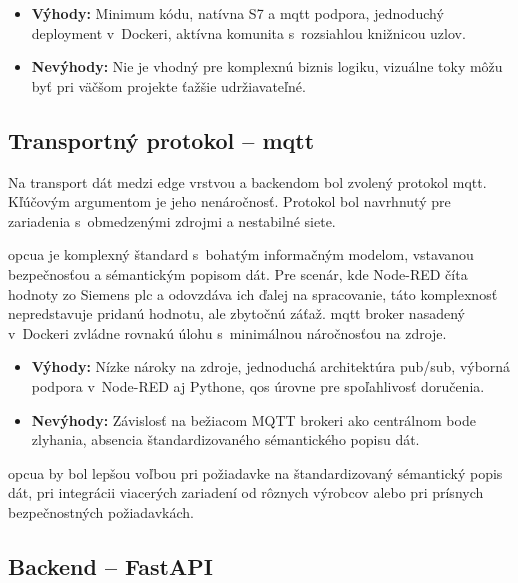 \begin{itemize}
      \item \textbf{Výhody:} Minimum kódu, natívna S7 a \acrshort{mqtt} podpora, jednoduchý deployment v~Dockeri, aktívna komunita s~rozsiahlou knižnicou uzlov.
      \item \textbf{Nevýhody:} Nie je vhodný pre komplexnú biznis logiku, vizuálne toky môžu byť pri väčšom projekte ťažšie udržiavateľné.
\end{itemize}

\subsection{Transportný protokol -- \acrshort{mqtt}}

Na transport dát medzi edge vrstvou a backendom bol zvolený protokol
\acrshort{mqtt}. Kľúčovým argumentom je jeho nenáročnosť. Protokol bol
navrhnutý pre zariadenia s~obmedzenými zdrojmi a nestabilné siete.

\acrshort{opcua} je komplexný štandard s~bohatým informačným modelom, vstavanou
bezpečnosťou a sémantickým popisom dát. Pre scenár, kde Node-RED číta hodnoty
zo Siemens \acrshort{plc} a odovzdáva ich ďalej na spracovanie, táto komplexnosť
nepredstavuje pridanú hodnotu, ale zbytočnú záťaž. \acrshort{mqtt} broker nasadený v~Dockeri zvládne rovnakú úlohu s~minimálnou náročnosťou na zdroje.

\begin{itemize}
      \item \textbf{Výhody:} Nízke nároky na zdroje, jednoduchá architektúra pub/sub, výborná podpora v~Node-RED aj Pythone, \acrshort{qos} úrovne pre spoľahlivosť doručenia.
      \item \textbf{Nevýhody:} Závislosť na bežiacom MQTT brokeri ako centrálnom bode zlyhania, absencia štandardizovaného sémantického popisu dát.
\end{itemize}

\acrshort{opcua} by bol lepšou voľbou pri požiadavke na štandardizovaný
sémantický popis dát, pri integrácii viacerých zariadení od rôznych výrobcov
alebo pri prísnych bezpečnostných požiadavkách.

\subsection{Backend -- FastAPI}


